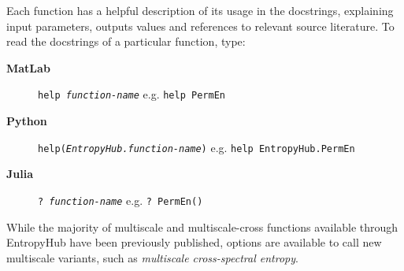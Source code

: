 \documentclass[12pt, a4paper, titlepage, openany]{book}
\begin{document}
\vspace{5mm}\noindent Each function has a helpful description of its usage in the docstrings, explaining input parameters, outputs values and references to relevant source literature. To read the docstrings of a particular function, type:

\begin{description}
\item[\textbf{MatLab}] 
\hspace{1mm} \texttt{help \emph{function-name}} \hspace{32mm} e.g. \texttt{help PermEn}
\item[\textbf{Python}] 
\hspace{4mm}\texttt{help(\emph{EntropyHub.function-name})} \hspace{2mm} e.g. \texttt{help EntropyHub.PermEn}
\item[\textbf{Julia}]  
\hspace{7mm} \texttt{? \emph{function-name}} \hspace{37mm} e.g. \texttt{? PermEn()}
\end{description}

\vspace{5mm}
\begin{tcolorbox}[sharp corners, colback=ehone!30, colframe=ehone, title=\textbf{BONUS}]
While the majority of multiscale and multiscale-cross functions available through EntropyHub have been previously published, options are available to call new multiscale variants, such as \emph{multiscale cross-spectral entropy}. 
\end{tcolorbox}
\end{document}
